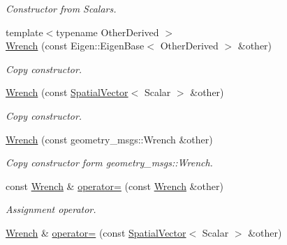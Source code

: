 \begin{DoxyCompactItemize}
\begin{DoxyCompactList}\small\item\em Constructor from Scalars. \end{DoxyCompactList}\item 
{\footnotesize template$<$typename Other\+Derived $>$ }\\\hyperlink{classow__core_1_1Wrench_a78e79150a8f7377ff4cb9be4f203a20d}{Wrench} (const Eigen\+::\+Eigen\+Base$<$ Other\+Derived $>$ \&other)
\begin{DoxyCompactList}\small\item\em Copy constructor. \end{DoxyCompactList}\item 
\hyperlink{classow__core_1_1Wrench_abcdf5ce5f84656a3bfcdbac3a11399f6}{Wrench} (const \hyperlink{classow__core_1_1SpatialVector}{Spatial\+Vector}$<$ Scalar $>$ \&other)\hypertarget{classow__core_1_1Wrench_abcdf5ce5f84656a3bfcdbac3a11399f6}{}\label{classow__core_1_1Wrench_abcdf5ce5f84656a3bfcdbac3a11399f6}

\begin{DoxyCompactList}\small\item\em Copy constructor. \end{DoxyCompactList}\item 
\hyperlink{classow__core_1_1Wrench_a57d2dfb70214e79f720d064124a8e102}{Wrench} (const geometry\+\_\+msgs\+::\+Wrench \&other)\hypertarget{classow__core_1_1Wrench_a57d2dfb70214e79f720d064124a8e102}{}\label{classow__core_1_1Wrench_a57d2dfb70214e79f720d064124a8e102}

\begin{DoxyCompactList}\small\item\em Copy constructor form geometry\+\_\+msgs\+::\+Wrench. \end{DoxyCompactList}\item 
const \hyperlink{classow__core_1_1Wrench}{Wrench} \& \hyperlink{classow__core_1_1Wrench_ae59bafa3008407d7bdb4504863aff9ad}{operator=} (const \hyperlink{classow__core_1_1Wrench}{Wrench} \&other)\hypertarget{classow__core_1_1Wrench_ae59bafa3008407d7bdb4504863aff9ad}{}\label{classow__core_1_1Wrench_ae59bafa3008407d7bdb4504863aff9ad}

\begin{DoxyCompactList}\small\item\em Assignment operator. \end{DoxyCompactList}\item 
\hyperlink{classow__core_1_1Wrench}{Wrench} \& \hyperlink{classow__core_1_1Wrench_a389bbbc54a4d23fc26386df9113254e4}{operator=} (const \hyperlink{classow__core_1_1SpatialVector}{Spatial\+Vector}$<$ Scalar $>$ \&other)\hypertarget{classow__core_1_1Wrench_a389bbbc54a4d23fc26386df9113254e4}{}\label{classow__core_1_1Wrench_a389bbbc54a4d23fc26386df9113254e4}


\end{DoxyCompactItemize}
